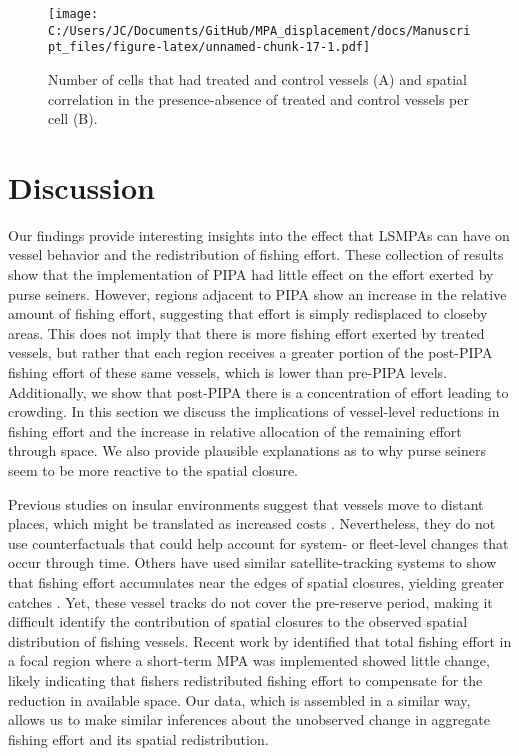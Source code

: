 \documentclass[11pt,]{article}
\begin{document}
\begin{figure}
\centering
\texttt{[image: C:/Users/JC/Documents/GitHub/MPA\_displacement/docs/Manuscript\_files/figure-latex/unnamed-chunk-17-1.pdf]}
\caption{\label{fig:unnamed-chunk-17}\label{fig:sp_corr}Number of cells that
had treated and control vessels (A) and spatial correlation in the
presence-absence of treated and control vessels per cell (B).}
\end{figure}

\clearpage

\hypertarget{discussion}{%
\section{Discussion}\label{discussion}}

Our findings provide interesting insights into the effect that LSMPAs
can have on vessel behavior and the redistribution of fishing effort.
These collection of results show that the implementation of PIPA had
little effect on the effort exerted by purse seiners. However, regions
adjacent to PIPA show an increase in the relative amount of fishing
effort, suggesting that effort is simply redisplaced to closeby areas.
This does not imply that there is more fishing effort exerted by treated
vessels, but rather that each region receives a greater portion of the
post-PIPA fishing effort of these same vessels, which is lower than
pre-PIPA levels. Additionally, we show that post-PIPA there is a
concentration of effort leading to crowding. In this section we discuss
the implications of vessel-level reductions in fishing effort and the
increase in relative allocation of the remaining effort through space.
We also provide plausible explanations as to why purse seiners seem to
be more reactive to the spatial closure.

Previous studies on insular environments suggest that vessels move to
distant places, which might be translated as increased costs
\citep{stevenson_2013}. Nevertheless, they do not use counterfactuals
that could help account for system- or fleet-level changes that occur
through time. Others have used similar satellite-tracking systems to
show that fishing effort accumulates near the edges of spatial closures,
yielding greater catches \citep{murawski_2005}. Yet, these vessel tracks
do not cover the pre-reserve period, making it difficult identify the
contribution of spatial closures to the observed spatial distribution of
fishing vessels. Recent work by \citet{elahi_2018} identified that total
fishing effort in a focal region where a short-term MPA was implemented
showed little change, likely indicating that fishers redistributed
fishing effort to compensate for the reduction in available space. Our
data, which is assembled in a similar way, allows us to make similar
inferences about the unobserved change in aggregate fishing effort and
its spatial redistribution.
\end{document}

